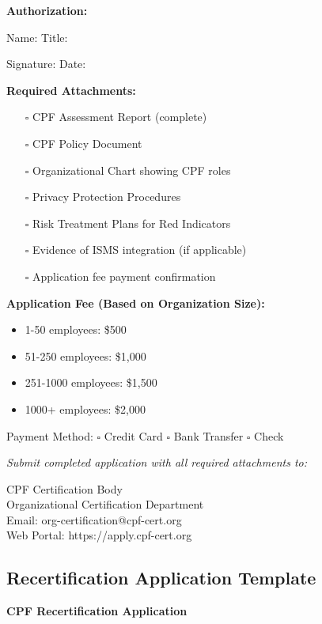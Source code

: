 \documentclass[11pt,a4paper]{article}
\begin{document}
\textbf{Authorization:}

Name: \underline{\hspace{8cm}} Title: \underline{\hspace{5cm}}

Signature: \underline{\hspace{8cm}} Date: \underline{\hspace{4cm}}

\textbf{Required Attachments:}
\begin{itemize}
\item[$\square$] CPF Assessment Report (complete)
\item[$\square$] CPF Policy Document
\item[$\square$] Organizational Chart showing CPF roles
\item[$\square$] Privacy Protection Procedures
\item[$\square$] Risk Treatment Plans for Red Indicators
\item[$\square$] Evidence of ISMS integration (if applicable)
\item[$\square$] Application fee payment confirmation
\end{itemize}

\textbf{Application Fee (Based on Organization Size):}
\begin{itemize}
\item 1-50 employees: \$500
\item 51-250 employees: \$1,000
\item 251-1000 employees: \$1,500
\item 1000+ employees: \$2,000
\end{itemize}

Payment Method: $\square$ Credit Card $\square$ Bank Transfer $\square$ Check

\textit{Submit completed application with all required attachments to:}

CPF Certification Body\\
Organizational Certification Department\\
Email: org-certification@cpf-cert.org\\
Web Portal: https://apply.cpf-cert.org

\subsection{Recertification Application Template}

\textbf{CPF Recertification Application}
\end{document}
